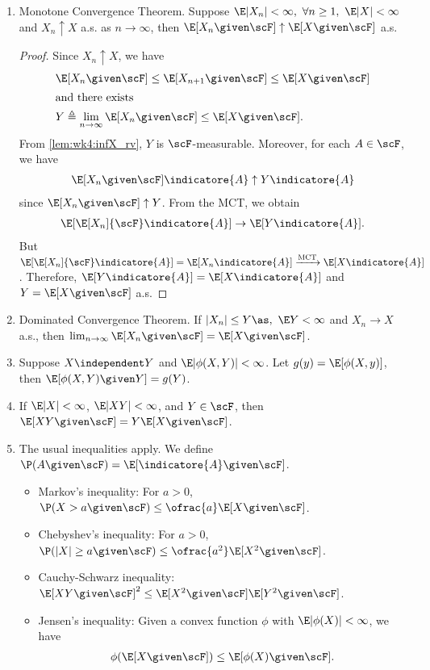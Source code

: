 \documentclass[../aipt.tex]{subfiles}
\begin{document}
\begin{enumerate}[1.]
\item Monotone Convergence Theorem. Suppose $\E |X_n|<\infty,\ \forall n\geq 1,\ \E|X|<\infty$ and $X_n \uparrow X$ a.s. as $n \to \infty$, then $\E[X_n \given \scF] \uparrow \E[X \given \scF]$ a.s.
\begin{proof}
Since $X_n \uparrow X$, we have
\begin{align*}
&\E[X_n \given \scF]\leq \E[X_{n+1} \given \scF]\leq \E[X \given \scF]\\
\intertext{and there exists}
&Y\triangleq \lim_{n\to \infty} \E [X_n \given \scF]\leq \E [X \given \scF].
\end{align*}
From \cref{lem:wk4:infX_rv}, $Y$ is $\scF$-measurable. Moreover, for each $A\in\scF$, we have
\begin{align*}
\E[X_n \given \scF]\indicatore{A} \uparrow  Y\indicatore{A}
\end{align*}
since $\E[X_n \given \scF] \uparrow Y$. From the MCT, we obtain
\begin{align*}
\E[\E[X_n]{\scF}\indicatore{A}] \to \E[Y\indicatore{A}].
\end{align*}
But $\E[\E[X_n]{\scF}\indicatore{A}]=\E[X_n\indicatore{A}] \xrightarrow{\text{MCT}} \E[X\indicatore{A}]$. Therefore, $\E[Y\indicatore{A}]=\E[X\indicatore{A}]$ and $Y=\E[X \given \scF]$ a.s. 
\end{proof}

\item Dominated Convergence Theorem. If $|X_n|\leq Y \as,\ \E Y<\infty$ and $X_n \to X$ a.s., then $\lim_{n\to \infty}\E[X_n \given \scF]=\E[X \given \scF]$.

\item Suppose $X\independent Y$ and $\E|\phi(X,Y)|<\infty$. Let $g(y)=\E [\phi(X,y)]$, then $\E[\phi(X,Y) \given Y]=g(Y)$.

\item If $\E|X|<\infty$, $\E|XY|<\infty$, and $Y\in \scF$, then $\E[XY \given \scF]=Y\E[X \given \scF]$.
 
\item The usual inequalities apply. We define $\P(A \given \scF) = \E[\indicatore{A} \given \scF]$.
\begin{itemize}
	\item Markov's inequality: For $a>0$, $\P(X>a \given \scF) \leq \ofrac{a}\E[X \given \scF]$.
	\item Chebyshev's inequality: For $a>0$, $\P({|X|\geq a} \given \scF) \leq \ofrac{a^2}\E[X^2 \given \scF]$.
	\item Cauchy-Schwarz inequality: $\E[XY \given \scF]^2 \leq \E[X^2 \given \scF] \E[Y^2 \given \scF]$.
	\item Jensen's inequality: Given a convex function $\phi$ with $\E|\phi(X)|<\infty$, we have 
	\begin{align*}
	\phi(\E[X \given \scF]) \leq \E[\phi(X) \given \scF].
	\end{align*}
\end{itemize}

\end{enumerate}
\end{document}
